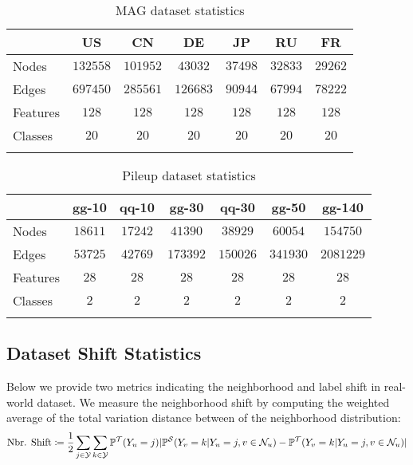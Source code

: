 \begin{table}[h!]
\caption{MAG dataset statistics}
\vspace{2mm}
\begin{center}
\begin{tabular}{lcccccc}
\toprule
            & US          & CN           & DE          &JP  & RU          &FR\\
\midrule
Nodes          & $132558$  & $101952$ & $43032$     &  $37498$  & $32833$     &  $29262$   \\
Edges        & $697450$ & $285561$ & $126683$    &$90944$    & $67994$     &  $78222$    \\
Features    & $128    $ & $128  $ & $128$   &    $128$  & $128$   &    $128$   \\
Classes        & $20$ & $20  $ & $20$    &$20$  & $20$    &$20$ \\
\bottomrule
\label{table:mag_datastats}
\end{tabular}
\end{center}
\vskip -0.7cm
\end{table}

\begin{table}[h!]
\caption{Pileup dataset statistics}
\vspace{2mm}
\begin{center}
\begin{tabular}{lcccccc}
\toprule
            & gg-10          & qq-10           & gg-30          &qq-30  &gg-50  & gg-140          \\
\midrule
Nodes          & $18611$  & $17242$ & $41390$     &  $38929$ & $60054$     &  $154750$     \\
Edges        & $ 53725 $ & $42769$ & $173392$    &$150026$  & $341930$    &$2081229$    \\
Features    & $28    $ & $28  $ & $28$   &    $28$  & $28$   &    $28$   \\
Classes        & $2    $ & $2  $ & $2$    &$2$  & $2$    &$2$      \\
\bottomrule
\label{table:pileup_datastats}
\end{tabular}
\end{center}
\vskip -0.7cm
\end{table}



\subsection{Dataset Shift Statistics}
\label{app:shift_stats}
Below we provide two metrics indicating the neighborhood and label shift in real-world dataset.
We measure the neighborhood shift by computing the weighted average of the total variation distance between of the neighborhood distribution:
\begin{align*}
    \text{Nbr. Shift}\coloneqq\frac{1}{2}\sum_{j\in{\mathcal{Y}}}\sum_{k\in{\mathcal{Y}}}\mathbb{P}^\mathcal{T}(Y_u=j)\lvert\mathbb{P}^\mathcal{S}(Y_v=k|Y_u=j,v\in \mathcal{N}_u) - \mathbb{P}^\mathcal{T}(Y_v=k|Y_u=j,v\in \mathcal{N}_u)\rvert
\end{align*}

